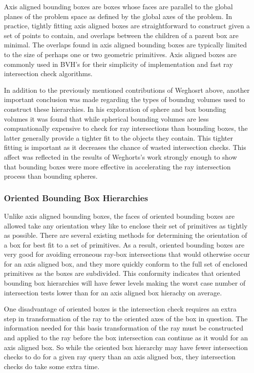 \documentclass[12pt, a4paper]{article}
\begin{document}
Axis aligned bounding boxes are boxes whose faces are parallel to the global planes of the problem space as defined by the global axes of the problem. In practice, tightly fitting axis aligned boxes are straightforward to construct given a set of points to contain, and overlaps between the children of a parent box are minimal. The overlaps found in axis aligned bounding boxes are typically limited to the size of perhaps one or two geometric primitives. Axis aligned boxes are commonly used in BVH's for their simplicity of implementation and fast ray intersection check algorithms.

In addition to the previously mentioned contributions of Weghosrt above, another important conclusion was made regarding the types of boundng volumes used to construct these hierarchies. In his exploration of sphere and box bounding volumes it was found that while spherical bounding volumes are less compuationally expensive to check for ray intersections than bounding boxes, the latter generally provide a tighter fit to the objects they contain. This tighter fitting is important as it decreases the chance of wasted intersection checks. This affect was reflected in the results of Weghorts's work strongly enough to show that bounding boxes were more effective in accelerating the ray intersection process than bounding spheres. 


\subsubsection{Oriented Bounding Box Hierarchies}%

Unlike axis aligned bounding boxes, the faces of oriented bounding boxes are allowed take any orientation whey like to enclose their set of primitives as tightly as possible. There are several existing methods for determining the orientation of a box for best fit to a set of primitives.\cite{gottschalk1996obbtree} As a result, oriented bounding boxes are very good for avoiding erroneous ray-box intersections that would otherwise occur for an axis aligned box, and they more quickly conform to the full set of enclosed primitives as the boxes are subdivided. This conformity indicates that oriented bounding box hierarchies will have fewer levels making the worst case number of intersection tests lower than for an axis aligned box hierachy on average.

One disadvantage of oriented boxes is the intersection check requires an extra step in transformation of the ray to the oriented axes of the box in question. The information needed for this basis transformation of the ray must be constructed and applied to the ray before the box intersection can continue as it would for an axis aligned box. So while the oriented box hierarchy may have fewer intersection checks to do for a given ray query than an axis aligned box, they intersection checks do take some extra time.
\end{document}
